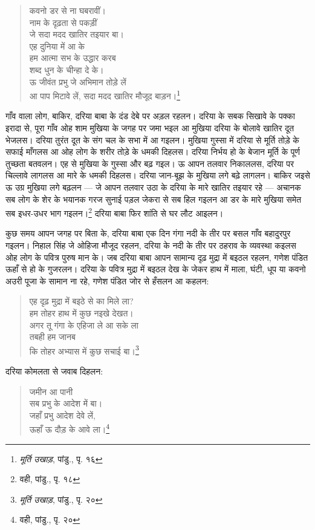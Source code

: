 \begin{quote}
कवनो डर से ना घबरावीं। \\
नाम के दृढ़ता से पकड़ीं \\
जे सदा मदद खातिर तइयार बा। \\
एह दुनिया में आ के \\
हम आत्मा सभ के उद्धार करब \\
शब्द धुन के चीन्हा दे के। \\
ऊ जीवंत प्रभु जे अभिमान तोड़े लें \\
आ पाप मिटावे लें, सदा मदद खातिर मौजूद बाड़न।\footnote{\textit{मूर्ति उखाड़}, पांडु., पृ. १६}
\end{quote}

गाँव वाला लोग, बाकिर, दरिया बाबा के दंड देबे पर अड़ल रहलन। दरिया के सबक सिखावे के पक्का इरादा से, पूरा गाँव ओह शाम मुखिया के जगह पर जमा भइल आ मुखिया दरिया के बोलावे खातिर दूत भेजलस। दरिया तुरंत दूत के संग चल के सभा में आ गइलन। मुखिया गुस्सा में दरिया से मूर्ति तोड़े के सफाई माँगलस आ ओह लोग के शरीर तोड़े के धमकी दिहलस। दरिया निर्भय हो के बेजान मूर्ति के पूर्ण तुच्छता बतवलन। एह से मुखिया के गुस्सा और बढ़ गइल। ऊ आपन तलवार निकाललस, दरिया पर चिल्लावे लागलस आ मारे के धमकी दिहलस। दरिया जान-बूझ के मुखिया लगे बढ़े लागलन। बाकिर जइसे ऊ उग्र मुखिया लगे बढ़लन — जे आपन तलवार उठा के दरिया के मारे खातिर तइयार रहे — अचानक सब लोग के शेर के भयानक गरज सुनाई पड़ल जेकरा से सब हिल गइलन आ डर के मारे मुखिया समेत सब इधर-उधर भाग गइलन।\footnote{वही, पांडु., पृ. १८} दरिया बाबा फिर शांति से घर लौट आइलन।

कुछ समय आपन जगह पर बिता के, दरिया बाबा एक दिन गंगा नदी के तीर पर बसल गाँव बहादुरपुर गइलन। निहाल सिंह जे ओहिजा मौजूद रहलन, दरिया के नदी के तीर पर ठहराव के व्यवस्था कइलस ओह लोग के पवित्र पुरुष मान के। जब दरिया बाबा आपन सामान्य दृढ़ मुद्रा में बइठल रहलन, गणेश पंडित ऊहाँ से हो के गुजरलन। दरिया के पवित्र मुद्रा में बइठल देख के जेकर हाथ में माला, घंटी, धूप या कवनो अउरी पूजा के सामान ना रहे, गणेश पंडित जोर से हँसलन आ कहलन:

\begin{quote}
एह दृढ़ मुद्रा में बइठे से का मिले ला? \\
हम तोहर हाथ में कुछ नइखे देखत। \\
अगर तू गंगा के एहिजा ले आ सके ला \\
तबही हम जानब \\
कि तोहर अभ्यास में कुछ सचाई बा।\footnote{\textit{मूर्ति उखाड़}, पांडु., पृ. २०}
\end{quote}

दरिया कोमलता से जवाब दिहलन:

\begin{quote}
जमीन आ पानी \\
सब प्रभु के आदेश में बा। \\
जहाँ प्रभु आदेश देवे लें, \\
ऊहाँ ऊ दौड़ के आवे ला।\footnote{वही, पांडु., पृ. २०}
\end{quote}

